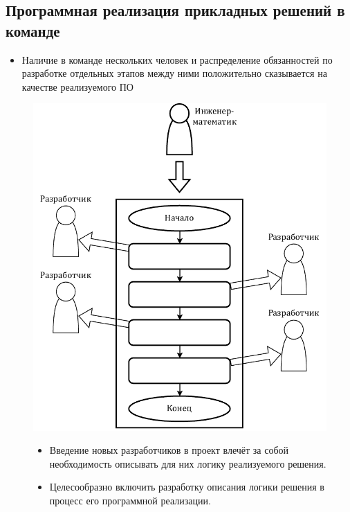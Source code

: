 \subsection{Программная реализация прикладных решений в команде}
\begin{frame}

  \begin{itemize}
    \item Наличие в команде нескольких человек и распределение обязанностей по разработке отдельных этапов между ними положительно сказывается на качестве реализуемого ПО
  \end{itemize}

  \begin{figure}
    \begin{minipage}{0.49\textwidth}
      \centering
      \includegraphics[height=0.6\textheight]{images/illustration.teamwork.pdf}
    \end{minipage}\hfill\begin{minipage}{0.49\textwidth}
      \begin{itemize}
        \item Введение новых разработчиков в проект влечёт за собой необходимость описывать для них логику реализуемого решения.
        \item Целесообразно включить разработку описания логики решения в процесс его программной реализации.
      \end{itemize}
    \end{minipage}\hfill
  \end{figure}

\end{frame}


